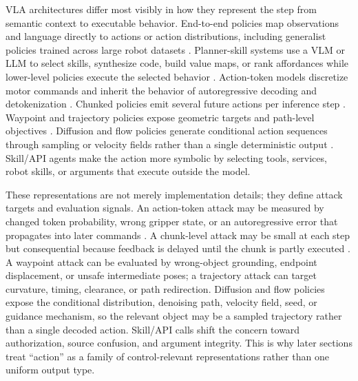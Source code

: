 VLA architectures differ most visibly in how they represent the step from semantic context to executable behavior. End-to-end policies map observations and language directly to actions or action distributions, including generalist policies trained across large robot datasets \cite{brohan2022rt1,brohan2023rt2,kim24openvla,ghosh2024octo,bousmalis2023robocat} \cite{wu2023gr1,li2023roboflamingo,cheang2024gr2,wang2025unified,nvidia2025gr00tn1}. Planner-skill systems use a VLM or LLM to select skills, synthesize code, build value maps, or rank affordances while lower-level policies execute the selected behavior \cite{ahn2022saycan,liang2023code,singh2023progprompt,huang2023voxposer,shridhar2022cliport} \cite{huang2022inner,wu2023tidybot,belkhale2024rth,yang2025magma}. Action-token models discretize motor commands and inherit the behavior of autoregressive decoding and detokenization \cite{brohan2022rt1,brohan2023rt2,kim24openvla,qu2025spatialvla,pertsch2025fast}. Chunked policies emit several future actions per inference step \cite{zhao2023act,kim2025openvlaoft,pertsch2025fast,liu2024rdt}. Waypoint and trajectory policies expose geometric targets and path-level objectives \cite{zeng2020transporter,shridhar2022peract,gervet2023act3d,goyal2023rvt,shridhar2022cliport}. Diffusion and flow policies generate conditional action sequences through sampling or velocity fields rather than a single deterministic output \cite{chi2023diffusion,black2024pi0,ze2024dp3,xian2024diffuseractor,liu2024rdt} \cite{reuss2024mdt,lu2026h3dp}. Skill/API agents make the action more symbolic by selecting tools, services, robot skills, or arguments that execute outside the model.

These representations are not merely implementation details; they define attack targets and evaluation signals. An action-token attack may be measured by changed token probability, wrong gripper state, or an autoregressive error that propagates into later commands \cite{shafiullah2022bet,lee2024vqbet,pertsch2025fast}. A chunk-level attack may be small at each step but consequential because feedback is delayed until the chunk is partly executed \cite{zhao2023act,kim2025openvlaoft,xu2026silentdrift}. A waypoint attack can be evaluated by wrong-object grounding, endpoint displacement, or unsafe intermediate poses; a trajectory attack can target curvature, timing, clearance, or path redirection. Diffusion and flow policies expose the conditional distribution, denoising path, velocity field, seed, or guidance mechanism, so the relevant object may be a sampled trajectory rather than a single decoded action. Skill/API calls shift the concern toward authorization, source confusion, and argument integrity. This is why later sections treat ``action'' as a family of control-relevant representations rather than one uniform output type.

